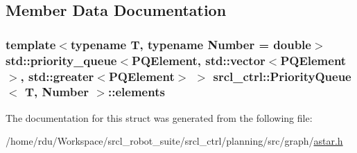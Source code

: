 \subsection{Member Data Documentation}
\hypertarget{structsrcl__ctrl_1_1PriorityQueue_afd9907537d5a1df02f71e6e0a7806b8f}{
\subsubsection[{elements}]{\setlength{\rightskip}{0pt plus 5cm}template$<$typename T, typename Number = double$>$ std\-::priority\-\_\-queue$<${\bf P\-Q\-Element}, std\-::vector$<${\bf P\-Q\-Element}$>$, std\-::greater$<${\bf P\-Q\-Element}$>$ $>$ {\bf srcl\-\_\-ctrl\-::\-Priority\-Queue}$<$ T, Number $>$\-::elements}}\label{structsrcl__ctrl_1_1PriorityQueue_afd9907537d5a1df02f71e6e0a7806b8f}


The documentation for this struct was generated from the following file\-:\begin{DoxyCompactItemize}
\item 
/home/rdu/\-Workspace/srcl\-\_\-robot\-\_\-suite/srcl\-\_\-ctrl/planning/src/graph/\hyperlink{astar_8h}{astar.\-h}\end{DoxyCompactItemize}
